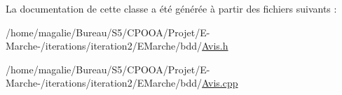 La documentation de cette classe a été générée à partir des fichiers suivants \-:\begin{DoxyCompactItemize}
\item 
/home/magalie/\-Bureau/\-S5/\-C\-P\-O\-O\-A/\-Projet/\-E-\/\-Marche-\//iterations/iteration2/\-E\-Marche/bdd/\hyperlink{_avis_8h}{Avis.\-h}\item 
/home/magalie/\-Bureau/\-S5/\-C\-P\-O\-O\-A/\-Projet/\-E-\/\-Marche-\//iterations/iteration2/\-E\-Marche/bdd/\hyperlink{_avis_8cpp}{Avis.\-cpp}\end{DoxyCompactItemize}
